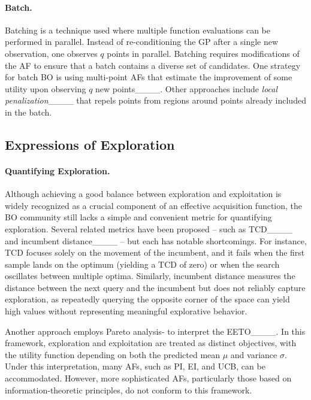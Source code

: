 \paragraph{Batch.}

Batching is a technique used where multiple function evaluations can be performed in parallel.
Instead of re-conditioning the \ac{GP} after a single new observation, one observes $q$ points in parallel.
Batching requires modifications of the \ac{AF} to ensure that a batch contains a diverse set of candidates.
One strategy for batch \ac{BO} is using multi-point \acp{AF} that estimate the improvement of some utility upon observing $q$ new points____.
Other approaches include \emph{local penalization}____ that repels points from regions around points already included in the batch.

\subsection{Expressions of Exploration}

\paragraph{Quantifying Exploration.}
Although achieving a good balance between exploration and exploitation is widely recognized as a crucial component of an effective acquisition function, the \ac{BO} community still lacks a simple and convenient metric for quantifying exploration. Several related metrics have been proposed -- such as \ac{TCD}____ and incumbent distance____ -- but each has notable shortcomings. For instance, \ac{TCD} focuses solely on the movement of the incumbent, and it fails when the first sample lands on the optimum (yielding a \ac{TCD} of zero) or when the search oscillates between multiple optima. Similarly, incumbent distance measures the distance between the next query and the incumbent but does not reliably capture exploration, as repeatedly querying the opposite corner of the space can yield high values without representing meaningful explorative behavior.

Another approach employs Pareto analysis- 
to interpret the \ac{EETO}____. In this framework, exploration and exploitation are treated as distinct objectives, with the utility function depending on both the predicted mean $\mu$ and variance $\sigma$. Under this interpretation, many \acp{AF}, such as \ac{PI}, \ac{EI}, and \ac{UCB}, can be accommodated. However, more sophisticated \acp{AF}, particularly those based on information-theoretic principles, do not conform to this framework.

